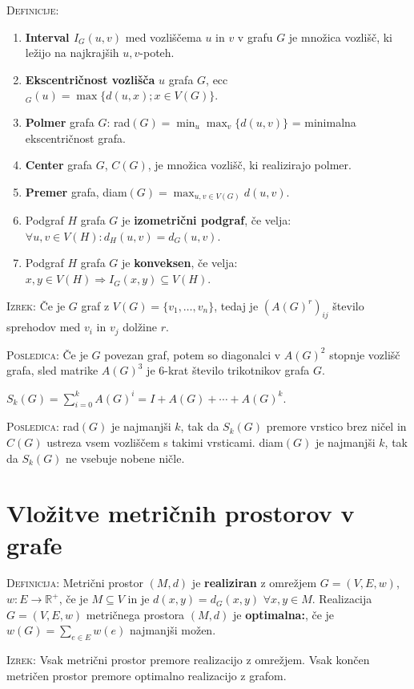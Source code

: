 \documentclass[8pt,a4paper]{amsart}
\theoremstyle{definition} %
\theoremstyle{plain} %
\newcommand{\R}{\mathbb R}
\begin{document}
\textsc{Definicije:}
\begin{enumerate}
\item \textbf{Interval $I_G(u,v)$} med vozliščema $u$ in $v$ v grafu $G$ je  množica vozlišč, ki ležijo na najkrajših $u,v$-poteh.
\item \textbf{Ekscentričnost vozlišča} $u$ grafa $G$, ecc$_G(u) = \max{\{d(u,x);x \in V(G) \}}$.
\item \textbf{Polmer} grafa $G$: rad$(G) = \min_u{\max_v{\{ d(u,v)\}}}$ = minimalna ekscentričnost grafa.
\item \textbf{Center} grafa $G$, $C(G)$, je množica vozlišč, ki realizirajo polmer.
\item \textbf{Premer} grafa, diam$(G) = \max_{u,v \in V(G)}d(u,v)$.
\item Podgraf $H$ grafa $G$ je \textbf{izometrični podgraf}, če velja: $\forall u,v \in V(H): d_H(u,v) = d_G(u,v)$.
\item Podgraf $H$ grafa $G$ je \textbf{konveksen}, če velja: $x,y \in V(H) \Longrightarrow I_G(x,y) \subseteq V(H)$.
\end{enumerate}

\textsc{Izrek:} Če je $G$ graf z $V(G) = \{ v_1,\ldots ,v_n \}$, tedaj je
$(A(G)^r)_{ij}$ število sprehodov med $v_i$ in $v_j$ dolžine $r$.

\textsc{Posledica:} Če je $G$ povezan graf, potem so diagonalci v $A(G)^2$
stopnje vozlišč grafa, sled matrike $A(G)^3$ je 6-krat število trikotnikov grafa
$G$.

$S_k(G) = \sum_{i=0}^kA(G)^i = I + A(G) + \cdots + A(G)^k$.

\textsc{Posledica:} rad$(G) $ je najmanjši $k$, tak da $S_k(G)$ premore vrstico
brez ničel in $C(G)$ ustreza vsem vozliščem s takimi vrsticami. diam$(G)$ je
najmanjši $k$, tak da $S_k(G)$ ne vsebuje nobene ničle.

\vspace{-2ex}
\section{Vložitve metričnih prostorov v grafe}

\textsc{Definicija:} Metrični prostor $(M,d)$ je \textbf{realiziran} z omrežjem
$G = (V,E,w)$, $w:E\longrightarrow \R^+$, če je $M \subseteq V$ in je $d(x,y) =
d_G(x,y)$ $\forall x,y \in M$. Realizacija $G=(V,E,w)$ metričnega prostora
$(M,d)$ je \textbf{optimalna:}, če je $w(G) = \sum_{e \in E} w(e)$ najmanjši
možen.

\textsc{Izrek:} Vsak metrični prostor premore realizacijo z omrežjem. Vsak
končen metričen prostor premore optimalno realizacijo z grafom.
\end{document}
